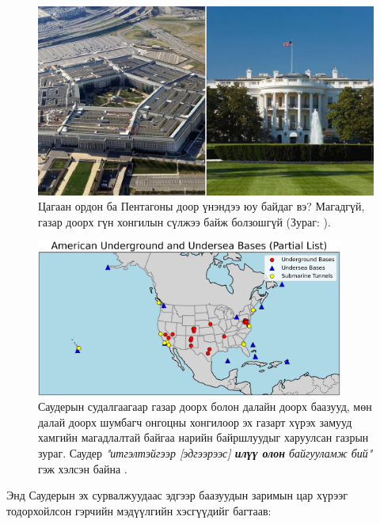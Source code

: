 \documentclass[10pt,twocolumn,letterpaper]{article}
\begin{document}
\begin{figure}[b]
\begin{center}
   \includegraphics[width=1\linewidth]{penta.jpg}
\end{center}
   \caption{Цагаан ордон ба Пентагоны доор үнэндээ юу байдаг вэ? Магадгүй, газар доорх гүн хонгилын сүлжээ байж болзошгүй (Зураг: \cite{31}).}
\label{fig:3}
\label{fig:onecol}
\end{figure}
\begin{figure}[t]
\begin{center}
\includegraphics[width=0.9\textwidth]{basescrop.png}
\end{center}
   \caption{Саудерын судалгаагаар газар доорх болон далайн доорх баазууд, мөн далай доорх шумбагч онгоцны хонгилоор эх газарт хүрэх замууд хамгийн магадлалтай байгаа нарийн байршлуудыг харуулсан газрын зураг. Саудер \textit{"итгэлтэйгээр [эдгээрээс] \textbf{илүү олон} байгууламж бий"} гэж хэлсэн байна \cite{22}.}
   \label{fig:4}
\end{figure}

Энд Саудерын эх сурвалжуудаас эдгээр баазуудын заримын цар хүрээг тодорхойлсон гэрчийн мэдүүлгийн хэсгүүдийг багтаав:
\end{document}
